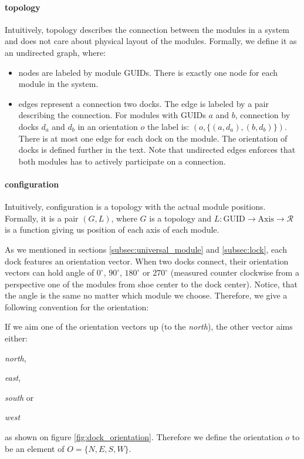 \paragraph{topology} Intuitively, topology describes the connection between the
modules in a system and does not care about physical layout of the modules.
Formally, we define it as an undirected graph, where:
\begin{itemize}
    \item nodes are labeled by module GUIDs. There is exactly one node for each
    module in the system.
    \item edges represent a connection two docks. The edge is labeled by a pair
    describing the connection. For modules with GUIDs $a$ and $b$, connection by
    docks $d_a$ and $d_b$ in an orientation $o$ the label is: $(o, \{(a, d_a),
    (b, d_b)\})$. There is at most one edge for each dock on the module. The
    orientation of docks is defined further in the text. Note that undirected
    edges enforces that both modules has to actively participate on a
    connection.
\end{itemize}

\paragraph{configuration} Intuitively, configuration is a topology with the
actual module positions. Formally, it is a pair $(G, L)$, where $G$ is a
topology and $L: \text{GUID} \rightarrow \text{Axis} \rightarrow \mathcal{R}$ is
a function giving us position of each axis of each module.

As we mentioned in sections \ref{subsec:universal_module} and \ref{subsec:lock},
each dock features an orientation vector. When two docks connect, their
orientation vectors can hold angle of $0^\circ$, $90^\circ$, $180^\circ$ or
$270^\circ$ (measured counter clockwise from a perspective one of the modules
from shoe center to the dock center). Notice, that the angle is the same no
matter which module we choose. Therefore, we give a following convention for the
orientation:

If we aim one of the orientation vectors up (to the \emph{north}), the other
vector aims either:
\begin{enumerate*}
    \item \emph{north},
    \item \emph{east},
    \item \emph{south} or
    \item \emph{west}
\end{enumerate*}
as shown on figure \ref{fig:dock_orientation}.
Therefore we define the orientation $o$ to be an element of $O = \{N, E, S,
W\}$.

